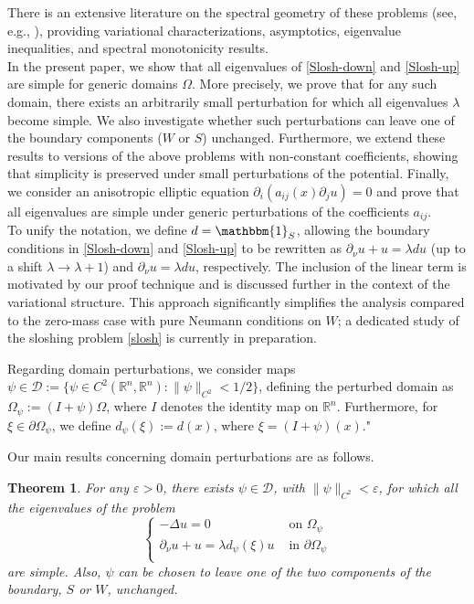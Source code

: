 \documentclass[a4paper,reqno,11pt,oneside]{amsart}
\theoremstyle{plain}
\newtheorem{thm}{Theorem}
\theoremstyle{plain}
\theoremstyle{plain}
\theoremstyle{remark}
\begin{document}
There is an extensive literature on the spectral geometry of these problems (see, e.g., \cite{bkps,gp1,gp2,kkk,lpps}), providing variational characterizations, asymptotics, eigenvalue inequalities, and spectral monotonicity results.\\


In the present paper, we show that all eigenvalues of \eqref{Slosh-down} and \eqref{Slosh-up} are simple for generic domains $\Omega$. More precisely, we prove that for any such domain, there exists an arbitrarily small perturbation for which all eigenvalues $\lambda$ become simple. We also investigate whether such perturbations can leave one of the boundary components ($W$ or $S$) unchanged. Furthermore, we extend these results to versions of the above problems with non-constant coefficients, showing that simplicity is preserved under small perturbations of the potential. Finally, we consider an anisotropic elliptic equation $\partial_i(a_{ij}(x)\partial_j u)=0$ and prove that all eigenvalues are simple under generic perturbations of the coefficients $a_{ij}$.\\
To unify the notation, we define $d=\mathbbm{1}_S$, allowing the boundary conditions in \eqref{Slosh-down} and \eqref{Slosh-up} to be rewritten as $\partial_\nu u + u = \lambda d u$ (up to a shift $\lambda \to \lambda+1$) and $\partial_\nu u = \lambda d u$, respectively. The inclusion of the linear term is motivated by our proof technique and is discussed further in the context of the variational structure. This approach significantly simplifies the analysis compared to the zero-mass case with pure Neumann conditions on $W$; a dedicated study of the sloshing problem \eqref{slosh} is currently in preparation.

Regarding domain perturbations, we consider maps $\psi \in \mathcal{D} := \{\psi \in C^2(\mathbb{R}^n, \mathbb{R}^n) : \|\psi\|_{C^2} < 1/2\}$, defining the perturbed domain as $\Omega_\psi := (I+\psi)\Omega$, where $I$ denotes the identity map on $\mathbb{R}^n$. Furthermore, for $\xi \in \partial \Omega_\psi$, we define $d_\psi(\xi) := d(x)$, where $\xi = (I+\psi)(x)$."


Our main results concerning domain perturbations are as follows.

\begin{thm}\label{thm:main-simp}
For any $\varepsilon >0$, there exists $\psi \in \mathcal{D}$, with 
$\|\psi\|_{C^2}<\varepsilon$, for which  all the eigenvalues of  the problem
\begin{equation}\label{mainpsisimp}
   \left\{
    \begin{array}{cc}
         -\Delta u=0& \text{ on } \Omega_\psi\\
        \partial_\nu u +u=\lambda d_\psi(\xi) u & \text{ in } \partial\Omega_\psi\\
    \end{array}
    \right.
\end{equation} 
are simple. Also, $\psi$ can be chosen to leave one of the two components of the boundary, $S$ or $W$, unchanged.

\end{thm}
\end{document}
